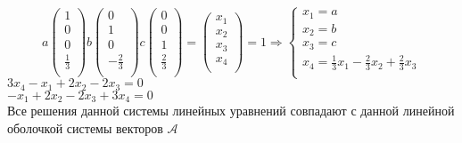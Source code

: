 \documentclass{article}
\begin{document}
    \[
    a
    \begin{pmatrix}
        1 \\
        0 \\
        0 \\
        \frac{1}{3} \\
    \end{pmatrix}
    b
    \begin{pmatrix}
        0 \\
        1 \\
        0 \\
        -\frac{2}{3} \\
    \end{pmatrix}
    c
    \begin{pmatrix}
        0 \\
        0 \\
        1 \\
        \frac{2}{3} \\
    \end{pmatrix}
    =
    \begin{pmatrix}
        x_1 \\
        x_2 \\
        x_3 \\
        x_4 \\
    \end{pmatrix}
    = 1 \Rightarrow
    \begin{cases}
        x_1 = a \\
        x_2 = b \\
        x_3 = c \\
        x_4 = \frac{1}{3}x_1 - \frac{2}{3}x_2 + \frac{2}{3}x_3 \\
    \end{cases}
    \]
    $3x_4 - x_1 + 2x_2 - 2x_3 = 0$ \\
    $-x_1 + 2x_2 - 2x_3 + 3x_4 = 0$ \\
    Все решения данной системы линейных уравнений совпадают  с данной линейной оболочкой системы векторов $\mathcal{A}$
   


\newpage  
\end{document}
